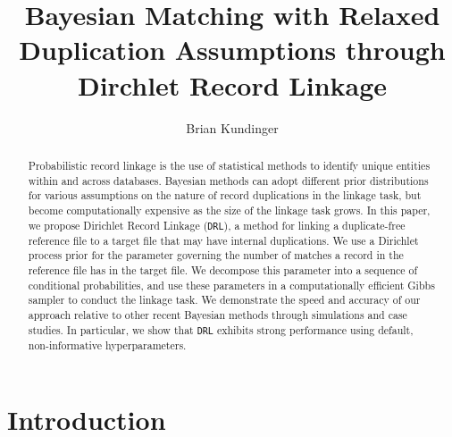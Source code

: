 \documentclass[12pt,letterpaper]{article}
\title{Bayesian Matching with Relaxed Duplication Assumptions through Dirchlet Record Linkage}
\author{Brian Kundinger}
\newcommand{\1}[1]{\mathbb{I}\!\left[#1\right]} %
\def\spacingset#1{\renewcommand{\baselinestretch}%
  {#1}\small\normalsize} \spacingset{1}
\begin{document}
\maketitle
%
\begin{abstract}
	Probabilistic record linkage is the use of statistical methods to identify unique entities within and across databases. Bayesian methods can adopt different prior distributions for various assumptions on the nature of record duplications in the linkage task, but become computationally expensive as the size of the linkage task grows. In this paper, we propose Dirichlet Record Linkage (\texttt{DRL}), a method for linking a duplicate-free reference file to a target file that may have internal duplications. We use a Dirichlet process prior for the parameter governing the number of matches a record in the reference file has in the target file. We decompose this parameter into a sequence of conditional probabilities, and use these parameters in a computationally efficient Gibbs sampler to conduct the linkage task. We demonstrate the speed and accuracy of our approach relative to other recent Bayesian methods through simulations and case studies. In particular, we show that \texttt{DRL} exhibits strong performance using default, non-informative hyperparameters.  
\end{abstract} 

%
\spacingset{1.5}
\newpage

\section{Introduction}\label{sec:introduction}


\end{document}
